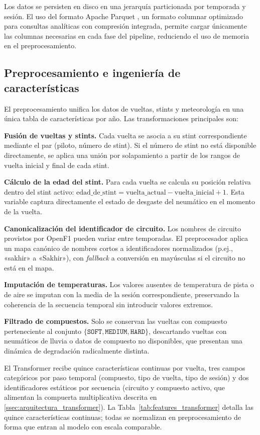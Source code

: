 Los datos se persisten en disco en una jerarquía particionada por temporada y sesión. El uso del formato Apache Parquet \cite{parquet}, un formato columnar optimizado para consultas analíticas con compresión integrada, permite cargar únicamente las columnas necesarias en cada fase del pipeline, reduciendo el uso de memoria en el preprocesamiento.

\subsection{Preprocesamiento e ingeniería de características}
\label{ssec:preprocessing}

El preprocesamiento unifica los datos de vueltas, stints y meteorología en una única tabla de características por año. Las transformaciones principales son:

\textbf{Fusión de vueltas y stints.} Cada vuelta se asocia a su stint correspondiente mediante el par (piloto, número de stint). Si el número de stint no está disponible directamente, se aplica una unión por solapamiento a partir de los rangos de vuelta inicial y final de cada stint.

\textbf{Cálculo de la edad del stint.} Para cada vuelta se calcula su posición relativa dentro del stint activo: $\text{edad\_de\_stint} = \text{vuelta\_actual} - \text{vuelta\_inicial} + 1$. Esta variable captura directamente el estado de desgaste del neumático en el momento de la vuelta.

\textbf{Canonicalización del identificador de circuito.} Los nombres de circuito provistos por OpenF1 pueden variar entre temporadas. El preprocesador aplica un mapa canónico de nombres cortos a identificadores normalizados (p.ej., «sakhir» a «Sakhir»), con \textit{fallback} a conversión en mayúsculas si el circuito no está en el mapa.

\textbf{Imputación de temperaturas.} Los valores ausentes de temperatura de pista o de aire se imputan con la media de la sesión correspondiente, preservando la coherencia de la secuencia temporal sin introducir valores extremos.

\textbf{Filtrado de compuestos.} Solo se conservan las vueltas con compuesto perteneciente al conjunto $\{\texttt{SOFT}, \texttt{MEDIUM}, \texttt{HARD}\}$, descartando vueltas con neumáticos de lluvia o datos de compuesto no disponibles, que presentan una dinámica de degradación radicalmente distinta.

El Transformer recibe quince características continuas por vuelta, tres campos categóricos por paso temporal (compuesto, tipo de vuelta, tipo de sesión) y dos identificadores estáticos por secuencia (circuito y compuesto activo, que alimentan la compuerta multiplicativa descrita en \ref{ssec:arquitectura_transformer}). La Tabla~\ref{tab:features_transformer} detalla las quince características continuas; todas se normalizan en preprocesamiento de forma que entran al modelo con escala comparable.

